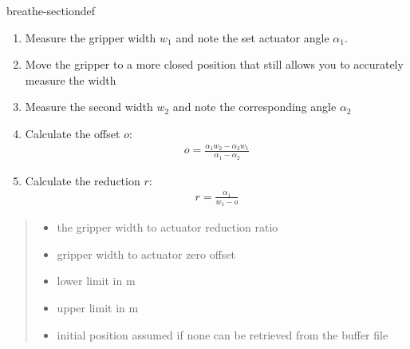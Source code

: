 \documentclass[letterpaper,10pt,english]{sphinxmanual}
\begin{document}
\begin{fulllineitems}
\begin{sphinxuseclass}{breathe-sectiondef}
\begin{fulllineitems}
\begin{enumerate}
\item {} 
\sphinxAtStartPar
Measure the gripper width \(w_1\) and note the set actuator angle \(\alpha_1\).

\item {} 
\sphinxAtStartPar
Move the gripper to a more closed position that still allows you to accurately measure the width

\item {} 
\sphinxAtStartPar
Measure the second width \(w_2\) and note the corresponding angle \(\alpha_2\)

\item {} 
\sphinxAtStartPar
Calculate the offset \(o\):  \begin{equation*}
\begin{split}
  o = \frac{\alpha_1 w_2 -  \alpha_2 w_1}{\alpha_1 - \alpha_2}
  \end{split}
\end{equation*}

\item {} 
\sphinxAtStartPar
Calculate the reduction \(r\):  \begin{equation*}
\begin{split}
  r = \frac{\alpha_1}{w_1 - o}
  \end{split}
\end{equation*}

\end{enumerate}

\begin{quote}\begin{description}
\begin{itemize}
\item {} 
\sphinxAtStartPar
{} \textendash{} the gripper width to actuator reduction ratio 

\item {} 
\sphinxAtStartPar
{} \textendash{} gripper width to actuator zero offset 

\item {} 
\sphinxAtStartPar
{} \textendash{} lower limit in m 

\item {} 
\sphinxAtStartPar
{} \textendash{} upper limit in m 

\item {} 
\sphinxAtStartPar
{} \textendash{} initial position assumed if none can be retrieved from the buffer file 


\end{itemize}
\end{description}
\end{quote}
\end{fulllineitems}
\end{sphinxuseclass}
\end{fulllineitems}
\end{document}
